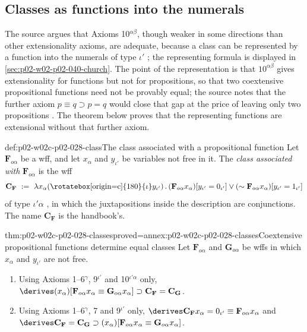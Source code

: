 \subsection{Classes as functions into the numerals}

The source argues that Axioms 10\(^{\alpha\beta}\), though weaker in some
directions than other extensionality axioms, are adequate, because a class
can be represented by a function into the numerals of type \(\iota'\)
\cite[\S4, p.~61]{Church1940}; the representing formula is displayed in
\cref{sec:p02-w02-p02-040-church}.  The point of the representation is
that \(10^{\alpha\beta}\) gives extensionality for functions but not for
propositions, so that two coextensive propositional functions need not be
provably equal; the source notes that the further axiom
\(p\equiv q\supset p=q\) would close that gap at the price of leaving only
two propositions \cite[\S4, p.~61]{Church1940}.  The theorem below proves
that the representing functions are extensional without that further axiom.

\begin{hbdefinition}{def:p02-w02c-p02-028-class}{The class associated with a propositional function}
Let \(\mathbf F_{o\alpha}\) be a wff, and let \(x_\alpha\) and
\(y_{\iota'}\) be variables not free in it.  The \emph{class associated with}
\(\mathbf F_{o\alpha}\) is the wff
\[
 \mathbf C_{\mathbf F}\ :=\ \lambda x_\alpha(\text{\rotatebox[origin=c]{180}{\(\iota\)}}y_{\iota'})\,.\,
 (\mathbf F_{o\alpha}x_\alpha)[y_{\iota'}=0_{\iota'}]\vee
 (\sim\mathbf F_{o\alpha}x_\alpha)[y_{\iota'}=1_{\iota'}]
\]
of type \(\iota'\alpha\) \cite[\S4, p.~61]{Church1940}, in which the
juxtapositions inside the description are conjunctions.  The name
\(\mathbf C_{\mathbf F}\) is the handbook's.
\end{hbdefinition}

\begin{hbtheorem}{thm:p02-w02c-p02-028-classes}{proved=annex:p02-w02c-p02-028-classes}{Coextensive propositional functions determine equal classes}
Let \(\mathbf F_{o\alpha}\) and \(\mathbf G_{o\alpha}\) be wffs in which
\(x_\alpha\) and \(y_{\iota'}\) are not free.
\begin{enumerate}
 \item Using Axioms 1--6\(^\gamma\), 9\(^{\iota'}\) and
   10\(^{\iota'\alpha}\) only,
   \(\derives(x_\alpha)[\mathbf F_{o\alpha}x_\alpha\equiv\mathbf G_{o\alpha}x_\alpha]
   \supset\mathbf C_{\mathbf F}=\mathbf C_{\mathbf G}\).
 \item Using Axioms 1--6\(^\gamma\), 7 and 9\(^{\iota'}\) only,
   \(\derives\mathbf C_{\mathbf F}x_\alpha=0_{\iota'}\equiv\mathbf F_{o\alpha}x_\alpha\)
   and
   \(\derives\mathbf C_{\mathbf F}=\mathbf C_{\mathbf G}\supset
   (x_\alpha)[\mathbf F_{o\alpha}x_\alpha\equiv\mathbf G_{o\alpha}x_\alpha]\).
\end{enumerate}
\end{hbtheorem}

